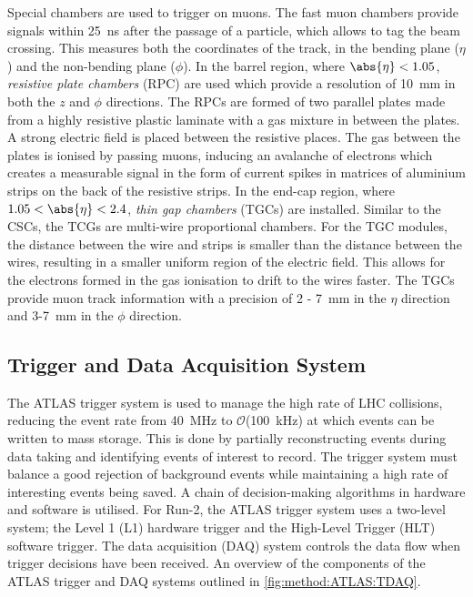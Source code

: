 Special chambers are used to trigger on muons. The fast muon chambers provide signals within \SI{25}{\nano\second} after the passage of a particle, which allows to tag the beam crossing. This measures both the coordinates of the track, in the bending plane ($\eta$) and the non-bending plane ($\phi$). In the barrel region, where $\abs{\eta} < 1.05$, \emph{resistive plate chambers} (RPC) are used which provide a resolution of \SI{10}{\milli\meter} in both the $z$ and $\phi$ directions. The RPCs are formed of two parallel plates made from a highly resistive plastic laminate with a gas mixture in between the plates. A strong electric field is placed between the resistive places. The gas between the plates is ionised by passing muons, inducing an avalanche of electrons which creates a measurable signal in the form of current spikes in matrices of aluminium strips on the back of the resistive strips. In the end-cap region, where $1.05 < \abs{\eta} < 2.4$, \emph{thin gap chambers} (TGCs) are installed. Similar to the CSCs, the TCGs are multi-wire proportional chambers. For the TGC modules, the distance between the wire and strips is smaller than the distance between the wires, resulting in a smaller uniform region of the electric field. This allows for the electrons formed in the gas ionisation to drift to the wires faster. The TGCs provide muon track information with a precision of 2 - \SI{7}{\milli\meter} in the $\eta$ direction and 3-\SI{7}{\milli\meter} in the $\phi$ direction.

\subsection{Trigger and Data Acquisition System}\label{sec:method:ATLAS:trigger}
The ATLAS trigger system is used to manage the high rate of LHC collisions, reducing the event rate from \SI{40}{\mega\hertz} to $\mathcal{O}$(\SI{100}{\kilo\hertz}) at which events can be written to mass storage. This is done by partially reconstructing events during data taking and identifying events of interest to record. The trigger system must balance a good rejection of background events while maintaining a high rate of interesting events being saved. A chain of decision-making algorithms in hardware and software is utilised. For Run-2, the ATLAS trigger system uses a two-level system; the Level 1 (L1) hardware trigger and the High-Level Trigger (HLT) software trigger. The data acquisition (DAQ) system controls the data flow when trigger decisions have been received. An overview of the components of the ATLAS trigger and DAQ systems outlined in \cref{fig:method:ATLAS:TDAQ}.

